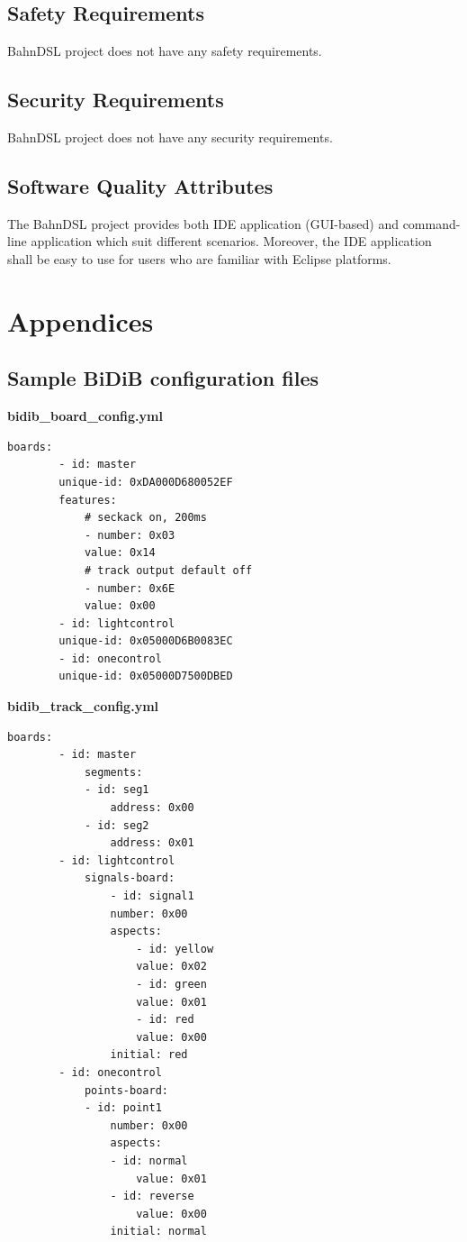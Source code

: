 \documentclass[a4paper,11pt]{scrreprt}
\begin{document}
\section{Safety Requirements}
BahnDSL project does not have any safety requirements.

\section{Security Requirements}
BahnDSL project does not have any security requirements.

\section{Software Quality Attributes}
The BahnDSL project provides both IDE application (GUI-based) and command-line application which suit different scenarios. Moreover, the IDE application shall be easy to use for users who are familiar with Eclipse platforms.

\appendix
\chapter{Appendices}

\section{Sample BiDiB configuration files}
\label{appendix_bidib}
\textbf{bidib_board_config.yml}
\begin{lstlisting}[basicstyle=\small]
    boards:
        - id: master
        unique-id: 0xDA000D680052EF
        features:
            # seckack on, 200ms
            - number: 0x03
            value: 0x14
            # track output default off
            - number: 0x6E
            value: 0x00
        - id: lightcontrol
        unique-id: 0x05000D6B0083EC
        - id: onecontrol
        unique-id: 0x05000D7500DBED
\end{lstlisting}

\textbf{bidib_track_config.yml}
\begin{lstlisting}[basicstyle=\small]
    boards:
        - id: master
            segments:
            - id: seg1
                address: 0x00
            - id: seg2
                address: 0x01
        - id: lightcontrol
            signals-board:
                - id: signal1
                number: 0x00
                aspects:
                    - id: yellow
                    value: 0x02
                    - id: green
                    value: 0x01
                    - id: red
                    value: 0x00
                initial: red
        - id: onecontrol
            points-board:
            - id: point1
                number: 0x00
                aspects:
                - id: normal
                    value: 0x01
                - id: reverse
                    value: 0x00
                initial: normal
\end{lstlisting}
\end{document}
